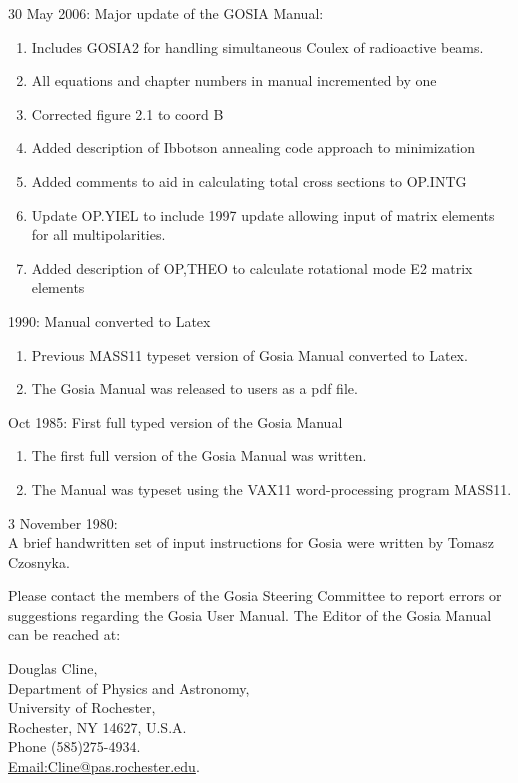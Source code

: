 \documentclass[10pt]{article}
\begin{document}
30 May 2006: Major update of the GOSIA Manual:

\begin{enumerate}
  \item Includes GOSIA2 for handling simultaneous Coulex of radioactive beams.
  \item All equations and chapter numbers in manual incremented by one
  \item Corrected figure 2.1 to coord B
  \item Added description of Ibbotson annealing code approach to minimization
  \item Added comments to aid in calculating total cross sections to OP.INTG
  \item Update OP.YIEL to include 1997 update allowing input of matrix elements for all multipolarities.
  \item Added description of OP,THEO to calculate rotational mode E2 matrix elements
\end{enumerate}

1990: Manual converted to Latex

\begin{enumerate}
  \item Previous MASS11 typeset version of Gosia Manual converted to Latex.
  \item The Gosia Manual was released to users as a pdf file.
\end{enumerate}

Oct 1985: First full typed version of the Gosia Manual

\begin{enumerate}
  \item The first full version of the Gosia Manual was written.
  \item The Manual was typeset using the VAX11 word-processing program MASS11.
\end{enumerate}

3 November 1980:\\
A brief handwritten set of input instructions for Gosia were written by Tomasz Czosnyka.

Please contact the members of the Gosia Steering Committee to report errors or suggestions regarding the Gosia User Manual. The Editor of the Gosia Manual can be reached at:

Douglas Cline,\\
Department of Physics and Astronomy,\\
University of Rochester,\\
Rochester, NY 14627, U.S.A.\\
Phone (585)275-4934.\\
\href{mailto:Email:Cline@pas.rochester.edu}{Email:Cline@pas.rochester.edu}.
\end{document}
